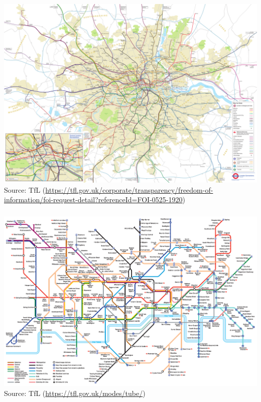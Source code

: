 \documentclass[8pt]{beamer}
\begin{document}
\begin{frame}
\frametitle{\insertsection}
\centering
\includegraphics[width=0.9\linewidth,height=\textheight,keepaspectratio]{London Connections Map}\\
\tiny Source: TfL (\url{https://tfl.gov.uk/corporate/transparency/freedom-of-information/foi-request-detail?referenceId=FOI-0525-1920})
\end{frame}

\begin{frame}
\frametitle{\insertsection}
\centering
\includegraphics[width=0.9\linewidth,height=\textheight,keepaspectratio]{tube}\\
\tiny Source: TfL (\url{https://tfl.gov.uk/modes/tube/})
\end{frame}

\end{document}
